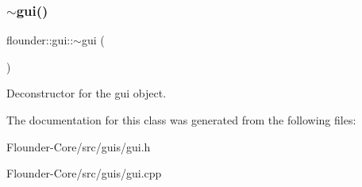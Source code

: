 \subsubsection{\texorpdfstring{$\sim$gui()}{~gui()}}
{\footnotesize\ttfamily flounder\+::gui\+::$\sim$gui (\begin{DoxyParamCaption}{ }\end{DoxyParamCaption})}



Deconstructor for the gui object. 



The documentation for this class was generated from the following files\+:\begin{DoxyCompactItemize}
\item 
Flounder-\/\+Core/src/guis/gui.\+h\item 
Flounder-\/\+Core/src/guis/gui.\+cpp\end{DoxyCompactItemize}
